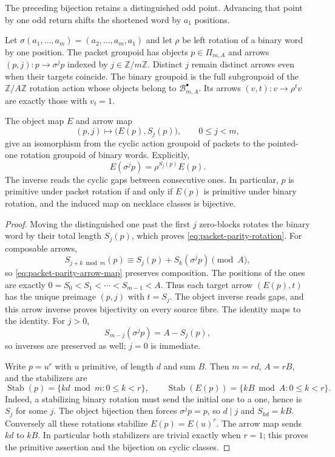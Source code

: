 The preceding bijection retains a distinguished odd point.  Advancing that
point by one odd return shifts the shortened word by $a_1$ positions.

Let $\sigma(a_1,\ldots,a_m)=(a_2,\ldots,a_m,a_1)$ and let $\rho$ be
left rotation of a binary word by one position.  The packet groupoid has
objects $p\in\Pi_{m,A}$ and arrows $(p,j):p\to\sigma^jp$ indexed by
$j\in\mathbb Z/m\mathbb Z$.  Distinct $j$ remain distinct arrows even
when their targets coincide.  The binary groupoid is the full subgroupoid
of the $\mathbb Z/A\mathbb Z$ rotation action whose objects belong to
$\mathcal B_{m,A}^{\bullet}$.  Its arrows $(v,t):v\to\rho^tv$ are
exactly those with $v_t=1$.

\begin{theorem}
\label{thm:packet-parity-cyclic-groupoid}
The object map $E$ and arrow map
\begin{equation}
 (p,j)\longmapsto\bigl(E(p),S_j(p)\bigr),
 \qquad 0\le j<m,
 \label{eq:packet-parity-arrow-map}
\end{equation}
give an isomorphism from the cyclic action groupoid of packets to the
pointed-one rotation groupoid of binary words.  Explicitly,
\begin{equation}
 E(\sigma^jp)=\rho^{S_j(p)}E(p).
 \label{eq:packet-parity-rotation}
\end{equation}
The inverse reads the cyclic gaps between consecutive ones.  In particular,
$p$ is primitive under packet rotation if and only if $E(p)$ is primitive
under binary rotation, and the induced map on necklace classes is bijective.
\end{theorem}

\begin{proof}
Moving the distinguished one past the first $j$ zero-blocks rotates the
binary word by their total length $S_j(p)$, which proves
\eqref{eq:packet-parity-rotation}.  For composable arrows,
\[
 S_{j+k\bmod m}(p)
 \equiv S_j(p)+S_k(\sigma^jp)\pmod A,
\]
so \eqref{eq:packet-parity-arrow-map} preserves composition.  The positions
of the ones are exactly $0=S_0<S_1<\cdots<S_{m-1}<A$.  Thus each target
arrow $(E(p),t)$ has the unique preimage $(p,j)$ with $t=S_j$.
The object inverse reads gaps, and this arrow inverse proves bijectivity on
every source fibre.  The identity maps to the identity.  For $j>0$,
\[
 S_{m-j}(\sigma^jp)=A-S_j(p),
\]
so inverses are preserved as well; $j=0$ is immediate.

Write $p=u^r$ with $u$ primitive, of length $d$ and sum $B$.
Then $m=rd$, $A=rB$, and the stabilizers are
\[
 \operatorname{Stab}(p)=\{kd\bmod m:0\le k<r\},\qquad
 \operatorname{Stab}(E(p))=\{kB\bmod A:0\le k<r\}.
\]
Indeed, a stabilizing binary rotation must send the initial one to a one,
hence is $S_j$ for some $j$.  The object bijection then forces
$\sigma^jp=p$, so $d\mid j$ and $S_{kd}=kB$.  Conversely all these
rotations stabilize $E(p)=E(u)^r$.  The arrow map sends $kd$ to $kB$.
In particular both stabilizers are trivial exactly when $r=1$; this proves
the primitive assertion and the bijection on cyclic classes.
\end{proof}

